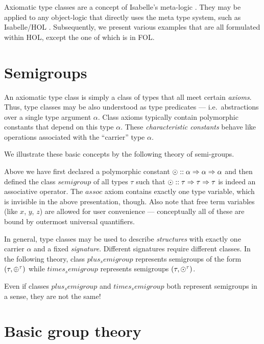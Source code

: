 Axiomatic type classes are a concept of Isabelle's meta-logic
\cite{paulson-isa-book,Wenzel:1997:TPHOL}.  They may be applied to any
object-logic that directly uses the meta type system, such as Isabelle/HOL
\cite{isabelle-HOL}.  Subsequently, we present various examples that are all
formulated within HOL, except the one of  which is in
FOL.

\section{Semigroups}

An axiomatic type class is simply a class of types that all meet certain
\emph{axioms}. Thus, type classes may be also understood as type predicates
--- i.e.\ abstractions over a single type argument $\alpha$.  Class axioms
typically contain polymorphic constants that depend on this type $\alpha$.
These \emph{characteristic constants} behave like operations associated with
the ``carrier'' type $\alpha$.

We illustrate these basic concepts by the following theory of semi-groups.

\bigskip

\bigskip

\noindent
Above we have first declared a polymorphic constant $\odot :: \alpha \Rightarrow
\alpha \Rightarrow \alpha$ and then defined the class $semigroup$ of all types $\tau$
such that $\odot :: \tau \Rightarrow \tau \Rightarrow \tau$ is indeed an associative
operator.  The $assoc$ axiom contains exactly one type variable, which is
invisible in the above presentation, though.  Also note that free term
variables (like $x$, $y$, $z$) are allowed for user convenience ---
conceptually all of these are bound by outermost universal quantifiers.

\medskip

In general, type classes may be used to describe \emph{structures} with
exactly one carrier $\alpha$ and a fixed \emph{signature}.  Different
signatures require different classes. In the following theory, class
$plus_semigroup$ represents semigroups of the form $(\tau, \oplus^\tau)$ while
$times_semigroup$ represents semigroups $(\tau, \odot^\tau)$.

\bigskip

\bigskip

\noindent Even if classes $plus_semigroup$ and $times_semigroup$ both represent
semigroups in a sense, they are not the same!


\section{Basic group theory}

